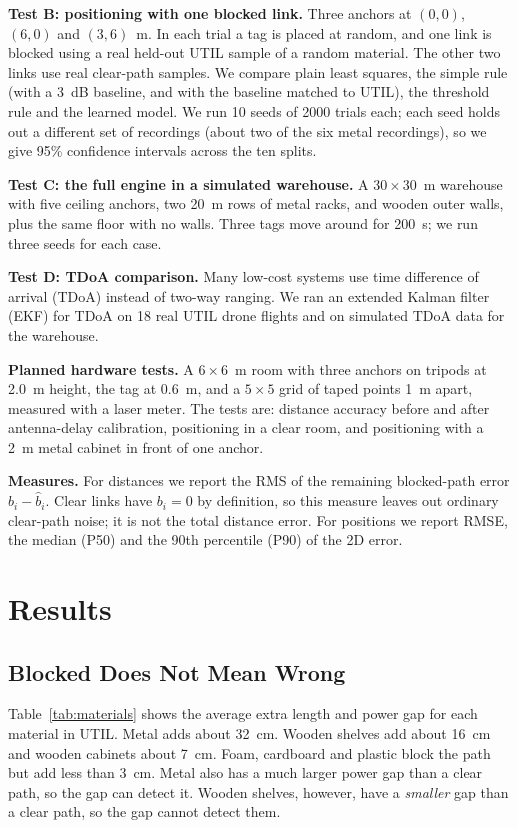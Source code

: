 \documentclass[conference]{IEEEtran}
\begin{document}
\textbf{Test B: positioning with one blocked link.} Three anchors at
$(0,0)$, $(6,0)$ and $(3,6)$~m. In each trial a tag is placed at random,
and one link is blocked using a real held-out UTIL sample of a random
material. The other two links use real clear-path samples. We compare plain
least squares, the simple rule (with a 3~dB baseline, and with the
baseline matched to UTIL), the threshold rule and the learned model. We run
10 seeds of 2000 trials each; each seed holds out a different set of
recordings (about two of the six metal recordings), so we give 95\%
confidence intervals across the ten splits.

\textbf{Test C: the full engine in a simulated warehouse.} A
$30 \times 30$~m warehouse with five ceiling anchors, two 20~m rows of metal
racks, and wooden outer walls, plus the same floor with no walls. Three
tags move around for 200~s; we run three seeds for each case.

\textbf{Test D: TDoA comparison.} Many low-cost systems use time difference
of arrival (TDoA) instead of two-way ranging. We ran an extended Kalman
filter (EKF) for TDoA on 18 real UTIL drone flights and on simulated TDoA
data for the warehouse.

\textbf{Planned hardware tests.} A $6 \times 6$~m room with three anchors on
tripods at 2.0~m height, the tag at 0.6~m, and a $5 \times 5$ grid of taped
points 1~m apart, measured with a laser meter. The tests are: distance
accuracy before and after antenna-delay calibration, positioning in a clear
room, and positioning with a 2~m metal cabinet in front of one anchor.

\textbf{Measures.} For distances we report the RMS of the remaining
blocked-path error $b_i - \hat{b}_i$. Clear links have $b_i = 0$ by
definition, so this measure leaves out ordinary clear-path noise; it is not
the total distance error. For positions we report RMSE, the median (P50) and the
90th percentile (P90) of the 2D error.

\section{Results}

\subsection{Blocked Does Not Mean Wrong}
Table~\ref{tab:materials} shows the average extra length and power gap for
each material in UTIL. Metal adds about 32~cm. Wooden shelves add about
16~cm and wooden cabinets about 7~cm. Foam, cardboard and plastic block the
path but add less than 3~cm. Metal also has a much larger power gap than
a clear path, so the gap can detect it. Wooden shelves, however, have a
\emph{smaller} gap than a clear path, so the gap cannot detect them.
\end{document}
